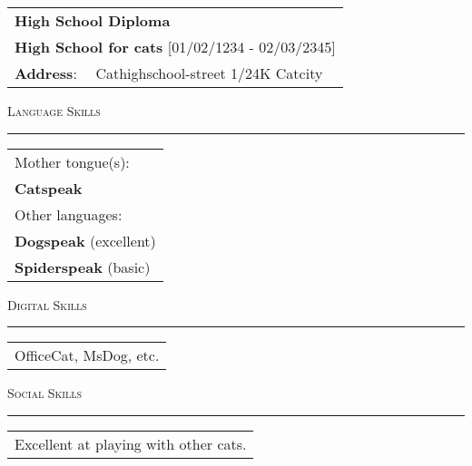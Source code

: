 \documentclass[
	fontsize = 10.0pt,
	a4paper,
	parskip = half*,
	twoside,	%
]{scrartcl}
\renewcommand{\arraystretch}{1.5}			%
\begin{document}
	\begin{table}[H]
		\begin{tabularx}{\textwidth}{l X}
			\multicolumn{2}{l}{{\fontsize{14pt}{10pt}\selectfont\bfseries High School Diploma}}	\\
			\multicolumn{2}{l}{{\fontsize{10pt}{10pt}\selectfont\bfseries High School for cats} [01/02/1234 - 02/03/2345]}	\\
			{\fontsize{10pt}{10pt}\selectfont\bfseries Address}: &	Cathighschool-street 1/24K Catcity	\\
		\end{tabularx}
	\end{table}

	\vspace{5mm}

	{\fontsize{20pt}{17pt}\selectfont\scshape Language Skills}
	\vskip 1mm%
	{\color{black!25}\hrule}

	\renewcommand{\arraystretch}{1.35}			%
	\begin{table}[H]
		\begin{tabular}{ l}
			Mother tongue(s):					\\
			\textbf{Catspeak}					\\
			Other languages:					\\
			\textbf{Dogspeak} (excellent)		\\
			\textbf{Spiderspeak} (basic)		\\
		\end{tabular}
	\end{table}%

	\vspace{5mm}

	{\fontsize{20pt}{17pt}\selectfont\scshape Digital Skills}
	\vskip 1mm%
	{\color{black!25}\hrule}

	\renewcommand{\arraystretch}{1.35}			%
	\begin{table}[H]
		\begin{tabular}{ l}
			OfficeCat, MsDog, etc.
		\end{tabular}
	\end{table}%


	\vspace{5mm}

	{\fontsize{20pt}{17pt}\selectfont\scshape Social Skills}
	\vskip 1mm%
	{\color{black!25}\hrule}

	\renewcommand{\arraystretch}{1.35}			%
	\begin{table}[H]
		\begin{tabular}{ l}
			Excellent at playing with other cats.
		\end{tabular}
	\end{table}%
\end{document}
